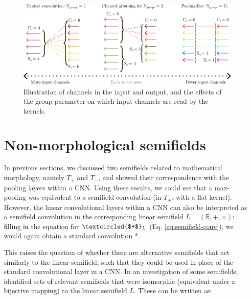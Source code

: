 \documentclass[a4paper, 12pt]{report}
\begin{document}
\begin{figure}[h!]
	\center
  \includegraphics[width=\textwidth]{figures/channels-groups.png}
  \caption{Illustration of channels in the input and output, and the effects of the group parameter on which input channels are read by the kernels.}
  \label{fig:channels-groups}
\end{figure}

\section{Non-morphological semifields}
\label{sec:non-morph}
In previous sections, we discussed two semifields related to mathematical morphology, namely $T_+$ and $T_-$, and showed their correspondence with the pooling layers within a CNN. Using these results, we could see that a max-pooling was equivalent to a semifield convolution (in $T_+$, with a flat kernel). However, the linear convolutional layers within a CNN can also be interpreted as a semifield convolution in the corresponding linear semifield
$L=(\mathbb{R}, +, \times)$: filling in the equation for $\textcircled{$*$}_L$ (Eq. \ref{eq:semifield-conv}), we would again obtain a standard convolution $*$.

This raises the question of whether there are alternative semifields that act similarly to the linear semifield, such that they could be used in place of the standard convolutional layer in a CNN. In an investigation of some semifields, \cite{bellaardaxiomatic} identified sets of relevant semifields that were isomorphic (equivalent under a bijective mapping) to the linear semifield $L$. These can be written as:
\end{document}
